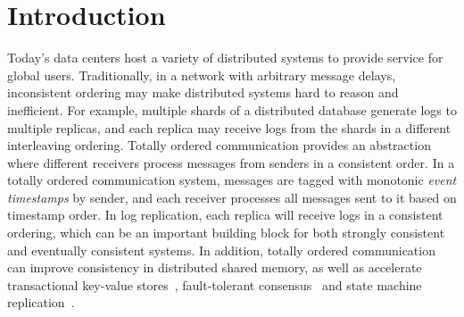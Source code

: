 \section{Introduction}
\label{sec:intro}

Today's data centers host a variety of distributed systems to provide service for global users.
Traditionally, in a network with arbitrary message delays, inconsistent ordering may make distributed systems hard to reason and inefficient.
For example, multiple shards of a distributed database generate logs to multiple replicas, and each replica may receive logs from the shards in a different interleaving ordering.
Totally ordered communication provides an abstraction where different receivers process messages from senders in a consistent order.
In a totally ordered communication system, messages are tagged with monotonic \textit{event timestamps} by sender, and each receiver processes all messages sent to it based on timestamp order. In log replication, each replica will receive logs in a consistent ordering, which can be an important building block for both strongly consistent and eventually consistent systems.
In addition, totally ordered communication can improve consistency in distributed shared memory, as well as accelerate transactional key-value stores~\cite{ports2015designing, eris}, fault-tolerant consensus~\cite{li2016just} and state machine replication~\cite{state-machine-replication}.

